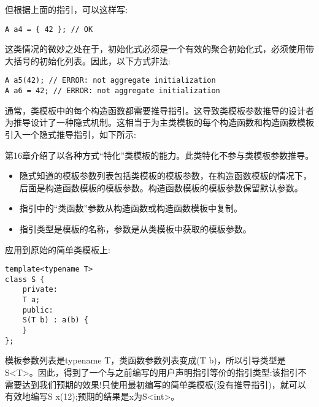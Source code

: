 但根据上面的指引，可以这样写:

\begin{lstlisting}[style=styleCXX]
A a4 = { 42 }; // OK
\end{lstlisting}

这类情况的微妙之处在于，初始化式必须是一个有效的聚合初始化式，必须使用带大括号的初始化列表。因此，以下方式非法:

\begin{lstlisting}[style=styleCXX]
A a5(42); // ERROR: not aggregate initialization
A a6 = 42; // ERROR: not aggregate initialization
\end{lstlisting}


通常，类模板中的每个构造函数都需要推导指引。这导致类模板参数推导的设计者为推导设计了一种隐式机制。这相当于为主类模板的每个构造函数和构造函数模板引入一个隐式推导指引，如下所示:

\begin{tcolorbox}[colback=webgreen!5!white,colframe=webgreen!75!black]
\hspace*{0.75cm}第16章介绍了以各种方式“特化”类模板的能力。此类特化不参与类模板参数推导。
\end{tcolorbox}

\begin{itemize}
\item 
隐式知道的模板参数列表包括类模板的模板参数，在构造函数模板的情况下，后面是构造函数模板的模板参数。构造函数模板的模板参数保留默认参数。

\item 
指引中的“类函数”参数从构造函数或构造函数模板中复制。

\item 
指引类型是模板的名称，参数是从类模板中获取的模板参数。
\end{itemize}	

应用到原始的简单类模板上:

\begin{lstlisting}[style=styleCXX]
template<typename T>
class S {
	private:
	T a;
	public:
	S(T b) : a(b) {
	}
};
\end{lstlisting}

模板参数列表是typename T，类函数参数列表变成(T b)，所以引导类型是S<T>。因此，得到了一个与之前编写的用户声明指引等价的指引类型:该指引不需要达到我们预期的效果!只使用最初编写的简单类模板(没有推导指引)，就可以有效地编写S x(12);预期的结果是x为S<int>。


